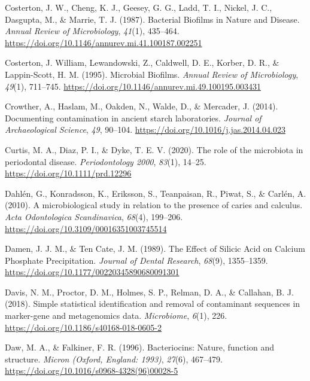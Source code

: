 \documentclass[
  letterpaper,
]{book}
\newlength{\cslhangindent}
\newlength{\cslentryspacingunit} %
\newenvironment{CSLReferences}[2] %
 {%
  \setlength{\parindent}{0pt}
  \ifodd #1
  \let\oldpar\par
  \def\par{\hangindent=\cslhangindent\oldpar}
  \fi
  \setlength{\parskip}{#2\cslentryspacingunit}
 }%
 {}
\begin{document}
\begin{CSLReferences}{1}{0}
\leavevmode{}%
Costerton, J. W., Cheng, K. J., Geesey, G. G., Ladd, T. I., Nickel, J.
C., Dasgupta, M., \& Marrie, T. J. (1987). Bacterial {Biofilms} in
{Nature} and {Disease}. \emph{Annual Review of Microbiology},
\emph{41}(1), 435--464.
\url{https://doi.org/10.1146/annurev.mi.41.100187.002251}

\leavevmode{}%
Costerton, J. William, Lewandowski, Z., Caldwell, D. E., Korber, D. R.,
\& Lappin-Scott, H. M. (1995). Microbial {Biofilms}. \emph{Annual Review
of Microbiology}, \emph{49}(1), 711--745.
\url{https://doi.org/10.1146/annurev.mi.49.100195.003431}

\leavevmode{}%
Crowther, A., Haslam, M., Oakden, N., Walde, D., \& Mercader, J. (2014).
Documenting contamination in ancient starch laboratories. \emph{Journal
of Archaeological Science}, \emph{49}, 90--104.
\url{https://doi.org/10.1016/j.jas.2014.04.023}

\leavevmode{}%
Curtis, M. A., Diaz, P. I., \& Dyke, T. E. V. (2020). The role of the
microbiota in periodontal disease. \emph{Periodontology 2000},
\emph{83}(1), 14--25. \url{https://doi.org/10.1111/prd.12296}

\leavevmode{}%
Dahlén, G., Konradsson, K., Eriksson, S., Teanpaisan, R., Piwat, S., \&
Carlén, A. (2010). A microbiological study in relation to the presence
of caries and calculus. \emph{Acta Odontologica Scandinavica},
\emph{68}(4), 199--206. \url{https://doi.org/10.3109/00016351003745514}

\leavevmode{}%
Damen, J. J. M., \& Ten Cate, J. M. (1989). The {Effect} of {Silicic
Acid} on {Calcium Phosphate Precipitation}. \emph{Journal of Dental
Research}, \emph{68}(9), 1355--1359.
\url{https://doi.org/10.1177/00220345890680091301}

\leavevmode{}%
Davis, N. M., Proctor, D. M., Holmes, S. P., Relman, D. A., \& Callahan,
B. J. (2018). Simple statistical identification and removal of
contaminant sequences in marker-gene and metagenomics data.
\emph{Microbiome}, \emph{6}(1), 226.
\url{https://doi.org/10.1186/s40168-018-0605-2}

\leavevmode{}%
Daw, M. A., \& Falkiner, F. R. (1996). Bacteriocins: Nature, function
and structure. \emph{Micron (Oxford, England: 1993)}, \emph{27}(6),
467--479. \url{https://doi.org/10.1016/s0968-4328(96)00028-5}


\end{CSLReferences}
\end{document}
